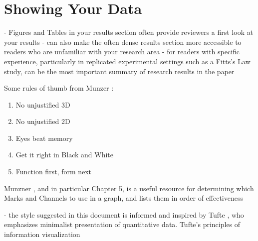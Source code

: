\newpage



\section{Showing Your Data}


- Figures and Tables in your results section often provide reviewers a first look at your results
- can also make the often dense results section more accessible to readers who are unfamiliar with your research area
- for readers with specific experience, particularly in replicated experimental settings such as a Fitts's Law study, can be the most important summary of research results in the paper 


Some rules of thumb from Munzer \cite{munznervisualization}:
\begin{enumerate}
	\item No unjustified 3D
	\item No unjustified 2D
	\item Eyes beat memory
	\item Get it right in Black and White
	\item Function first, form next
\end{enumerate}


Munzner \cite{munznervisualization}, and in particular Chapter 5, is a useful resource for determining which Marks and Channels to use in a graph, and lists them in order of effectiveness

- the style suggested in this document is informed and inspired by Tufte \cite{tufte1983visual}, who emphasizes minimalist presentation of quantitative data. Tufte's principles of information visualization 

 
 


 
 














